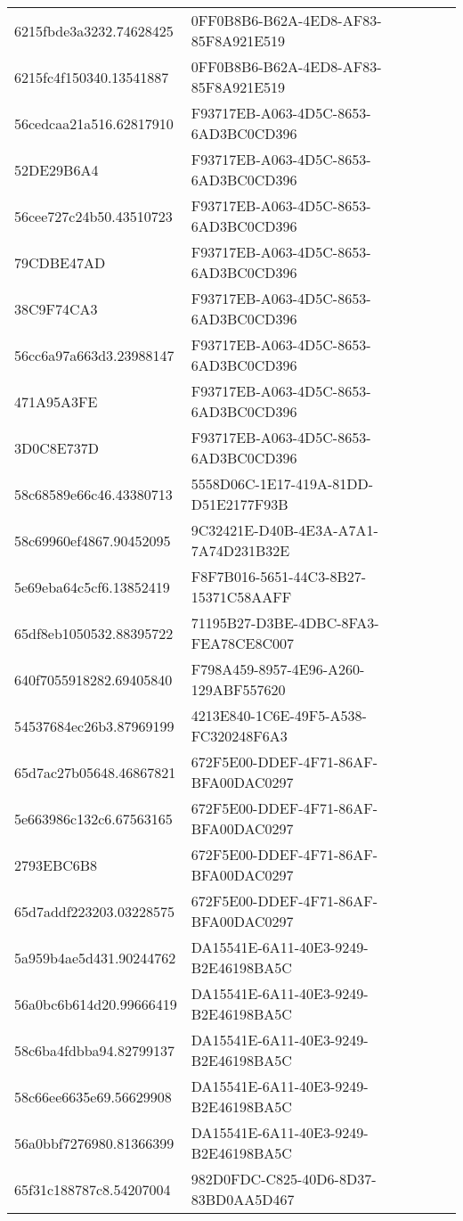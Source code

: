 \begin{tabular}{ll}
6215fbde3a3232.74628425 & 0FF0B8B6-B62A-4ED8-AF83-85F8A921E519 \\
6215fc4f150340.13541887 & 0FF0B8B6-B62A-4ED8-AF83-85F8A921E519 \\
56cedcaa21a516.62817910 & F93717EB-A063-4D5C-8653-6AD3BC0CD396 \\
52DE29B6A4 & F93717EB-A063-4D5C-8653-6AD3BC0CD396 \\
56cee727c24b50.43510723 & F93717EB-A063-4D5C-8653-6AD3BC0CD396 \\
79CDBE47AD & F93717EB-A063-4D5C-8653-6AD3BC0CD396 \\
38C9F74CA3 & F93717EB-A063-4D5C-8653-6AD3BC0CD396 \\
56cc6a97a663d3.23988147 & F93717EB-A063-4D5C-8653-6AD3BC0CD396 \\
471A95A3FE & F93717EB-A063-4D5C-8653-6AD3BC0CD396 \\
3D0C8E737D & F93717EB-A063-4D5C-8653-6AD3BC0CD396 \\
58c68589e66c46.43380713 & 5558D06C-1E17-419A-81DD-D51E2177F93B \\
58c69960ef4867.90452095 & 9C32421E-D40B-4E3A-A7A1-7A74D231B32E \\
5e69eba64c5cf6.13852419 & F8F7B016-5651-44C3-8B27-15371C58AAFF \\
65df8eb1050532.88395722 & 71195B27-D3BE-4DBC-8FA3-FEA78CE8C007 \\
640f7055918282.69405840 & F798A459-8957-4E96-A260-129ABF557620 \\
54537684ec26b3.87969199 & 4213E840-1C6E-49F5-A538-FC320248F6A3 \\
65d7ac27b05648.46867821 & 672F5E00-DDEF-4F71-86AF-BFA00DAC0297 \\
5e663986c132c6.67563165 & 672F5E00-DDEF-4F71-86AF-BFA00DAC0297 \\
2793EBC6B8 & 672F5E00-DDEF-4F71-86AF-BFA00DAC0297 \\
65d7addf223203.03228575 & 672F5E00-DDEF-4F71-86AF-BFA00DAC0297 \\
5a959b4ae5d431.90244762 & DA15541E-6A11-40E3-9249-B2E46198BA5C \\
56a0bc6b614d20.99666419 & DA15541E-6A11-40E3-9249-B2E46198BA5C \\
58c6ba4fdbba94.82799137 & DA15541E-6A11-40E3-9249-B2E46198BA5C \\
58c66ee6635e69.56629908 & DA15541E-6A11-40E3-9249-B2E46198BA5C \\
56a0bbf7276980.81366399 & DA15541E-6A11-40E3-9249-B2E46198BA5C \\
65f31c188787c8.54207004 & 982D0FDC-C825-40D6-8D37-83BD0AA5D467 \\

\end{tabular}
